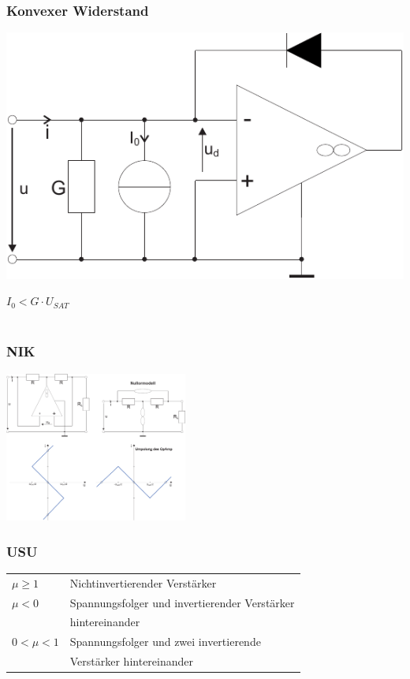 \documentclass[a4paper,twocolumn,10pt]{article}
\begin{document}
\subsubsection*{Konvexer Widerstand}
\begin{minipage}[b]{0.25\textwidth}
\includegraphics[width=\textwidth]{Grafiken/OP_Rkonvex}
\end{minipage}
\hfill
\begin{minipage}[b]{0.2\textwidth}
$I_0<G\cdot U_{SAT}$\\\\
\end{minipage}

\subsubsection*{NIK}
\includegraphics[width=0.45\textwidth]{Grafiken/OP_NIK}

\subsubsection*{USU}
\begin{tabular}{ll}
$\mu\geq 1$ & Nichtinvertierender Verstärker\\
$\mu<0$ & Spannungsfolger und invertierender Verstärker\\
& hintereinander\\
$0<\mu<1$ & Spannungsfolger und zwei invertierende\\
& Verstärker hintereinander
\end{tabular}
\end{document}
